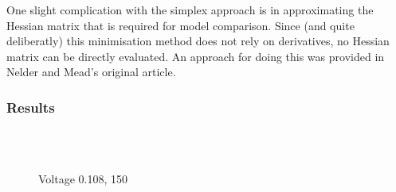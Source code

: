 One slight complication with the simplex approach is in approximating the Hessian matrix
that is required for model comparison.
Since (and quite deliberatly)
this minimisation method does not rely on derivatives,
no Hessian matrix can be directly evaluated.
An approach for doing this was provided in  Nelder and Mead's original article\cite{Nelder1965}.



\subsubsection{Results}



\begin{figure}[t]%
  \centering
  \\
  \\
  \label{fig:plot_bubble_fit_108_150}
\caption{Voltage 0.108, 150}
\end{figure}



